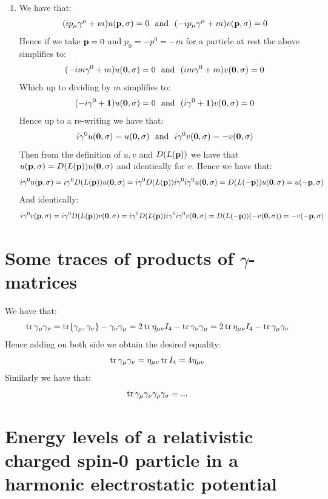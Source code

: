 \documentclass[10pt,a4paper]{article}
\begin{document}
\begin{enumerate}
\item We have that:
\[
(i p_\mu \gamma^\mu + m) u(\vb{p}, \sigma) = 0 \mbox{~~and~~} (-i p_\mu \gamma^\mu + m) v(\vb{p}, \sigma) = 0
\]
Hence if we take $\vb{p} = 0$ and $p_0 = -p^0 = -m$ for a particle at rest the above simplifies to:
\[
(-im \gamma^0 + m) u(\vb{0}, \sigma) = 0 \mbox{~~and~~} (i m \gamma^0 + m) v(\vb{0}, \sigma) = 0
\]
Which up to dividing by $m$ simplifies to:
\[
(-i \gamma^0 + \vb{1}) u(\vb{0}, \sigma) = 0 \mbox{~~and~~} (i\gamma^0 + \vb{1}) v(\vb{0}, \sigma) = 0
\]
Hence up to a re-writing we have that:
\[
i\gamma^0 u(\vb{0}, \sigma) = u(\vb{0}, \sigma) \mbox{~~and~~} i\gamma^0 v(\vb{0}, \sigma) = - v(\vb{0}, \sigma)
\]
Then from the definition of $u, v$ and $D(L(\vb{p}))$ we have that $u(\vb{p}, \sigma) = D(L(\vb{p})) u(\vb{0}, \sigma)$ and identically for $v$. Hence we have that:
\[
i \gamma^0 u(\vb{p}, \sigma) = i \gamma^0 D(L(\vb{p})) u(\vb{0}, \sigma) = i \gamma^0 D(L(\vb{p})) i \gamma^0 i \gamma^0 u(\vb{0}, \sigma) = D(L(-\vb{p})) u(\vb{0}, \sigma) = u(-\vb{p}, \sigma)
\]
And identically:
\[
i\gamma^0 v(\vb{p}, \sigma) = i\gamma^0 D(L(\vb{p})) v(\vb{0}, \sigma) = i \gamma^0 D(L(\vb{p})) i \gamma^0 i \gamma^0 v(\vb{0}, \sigma) = D(L(-\vb{p})) (-v(\vb{0}, \sigma)) = - v(-\vb{p}, \sigma) 
\]

\end{enumerate}


\section{Some traces of products of $\gamma$-matrices}

We have that:
\[
\tr \gamma_\mu \gamma_\nu = \tr {\gamma_\mu, \gamma_\nu} - \gamma_\nu \gamma_\mu = 2 \tr \eta_{\mu \nu} I_4 - \tr \gamma_\nu \gamma_\mu = 2 \tr \eta_{\mu \nu} I_4 - \tr \gamma_\mu \gamma_\nu
\]
Hence adding on both side we obtain the desired equality:
\[
\tr \gamma_\mu \gamma_\nu = \eta_{\mu \nu} \tr I_4 = 4 \eta_{\mu \nu}
\]
Similarly we have that:
\[
\tr \gamma_\mu \gamma_\nu \gamma_\rho \gamma_\sigma = ... 
\]

\section{Energy levels of a relativistic charged spin-0 particle in a harmonic electrostatic potential}
\end{document}
